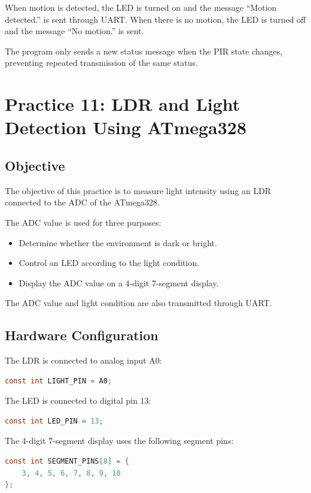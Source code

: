 \documentclass[12pt,a4paper]{article}
\begin{document}
When motion is detected, the LED is turned on and the message
``Motion detected.'' is sent through UART. When there is no motion, the
LED is turned off and the message ``No motion.'' is sent.

The program only sends a new status message when the PIR state changes,
preventing repeated transmission of the same status.


\section{Practice 11: LDR and Light Detection Using ATmega328}

\subsection{Objective}

The objective of this practice is to measure light intensity using an
LDR connected to the ADC of the ATmega328.

The ADC value is used for three purposes:

\begin{itemize}
    \item Determine whether the environment is dark or bright.
    \item Control an LED according to the light condition.
    \item Display the ADC value on a 4-digit 7-segment display.
\end{itemize}

The ADC value and light condition are also transmitted through UART.

\subsection{Hardware Configuration}

The LDR is connected to analog input A0:

\begin{lstlisting}[language=C]
const int LIGHT_PIN = A0;
\end{lstlisting}

The LED is connected to digital pin 13:

\begin{lstlisting}[language=C]
const int LED_PIN = 13;
\end{lstlisting}

The 4-digit 7-segment display uses the following segment pins:

\begin{lstlisting}[language=C]
const int SEGMENT_PINS[8] = {
    3, 4, 5, 6, 7, 8, 9, 10
};
\end{lstlisting}
\end{document}
